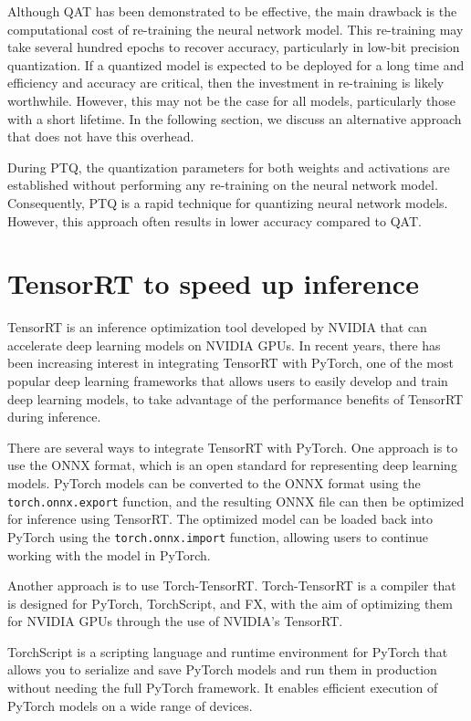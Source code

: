 Although QAT has been demonstrated to be effective, the main drawback is the computational cost of re-training the neural network model. This re-training may take several hundred epochs to recover accuracy, particularly in low-bit precision quantization. If a quantized model is expected to be deployed for a long time and efficiency and accuracy are critical, then the investment in re-training is likely worthwhile. However, this may not be the case for all models, particularly those with a short lifetime. In the following section, we discuss an alternative approach that does not have this overhead.

During PTQ, the quantization parameters for both weights and activations are established without performing any re-training on the neural network model. Consequently, PTQ is a rapid technique for quantizing neural network models. However, this approach often results in lower accuracy compared to QAT.

\section{TensorRT to speed up inference}
\label{sec:tensorrt}

TensorRT is an inference optimization tool developed by NVIDIA that can accelerate deep learning models on NVIDIA GPUs. In recent years, there has been increasing interest in integrating TensorRT with PyTorch, one of the most popular deep learning frameworks that allows users to easily develop and train deep learning models, to take advantage of the performance benefits of TensorRT during inference.
 
There are several ways to integrate TensorRT with PyTorch. One approach is to use the ONNX format, which is an open standard for representing deep learning models. PyTorch models can be converted to the ONNX format using the \texttt{torch.onnx.export} function, and the resulting ONNX file can then be optimized for inference using TensorRT. The optimized model can be loaded back into PyTorch using the \texttt{torch.onnx.import} function, allowing users to continue working with the model in PyTorch.

Another approach is to use Torch-TensorRT. Torch-TensorRT is a compiler that is designed for PyTorch, TorchScript, and FX, with the aim of optimizing them for NVIDIA GPUs through the use of NVIDIA's TensorRT.

TorchScript is a scripting language and runtime environment for PyTorch that allows you to serialize and save PyTorch models and run them in production without needing the full PyTorch framework. It enables efficient execution of PyTorch models on a wide range of devices.

